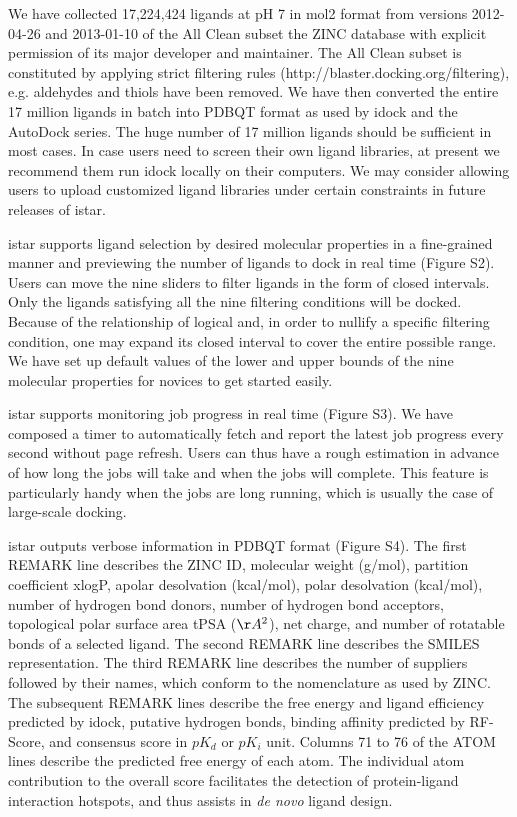 \documentclass[10pt]{article}
\begin{document}
We have collected 17,224,424 ligands at pH 7 in mol2 format from versions 2012-04-26 and 2013-01-10 of the All Clean subset the ZINC database \cite{532,1178} with explicit permission of its major developer and maintainer. The All Clean subset is constituted by applying strict filtering rules (http://blaster.docking.org/filtering), e.g. aldehydes and thiols have been removed. We have then converted the entire 17 million ligands in batch into PDBQT format as used by idock and the AutoDock series. The huge number of 17 million ligands should be sufficient in most cases. In case users need to screen their own ligand libraries, at present we recommend them run idock locally on their computers. We may consider allowing users to upload customized ligand libraries under certain constraints in future releases of istar.

istar supports ligand selection by desired molecular properties in a fine-grained manner and previewing the number of ligands to dock in real time (Figure S2). Users can move the nine sliders to filter ligands in the form of closed intervals. Only the ligands satisfying all the nine filtering conditions will be docked. Because of the relationship of logical and, in order to nullify a specific filtering condition, one may expand its closed interval to cover the entire possible range. We have set up default values of the lower and upper bounds of the nine molecular properties for novices to get started easily.

istar supports monitoring job progress in real time (Figure S3). We have composed a timer to automatically fetch and report the latest job progress every second without page refresh. Users can thus have a rough estimation in advance of how long the jobs will take and when the jobs will complete. This feature is particularly handy when the jobs are long running, which is usually the case of large-scale docking.

istar outputs verbose information in PDBQT format (Figure S4). The first REMARK line describes the ZINC ID, molecular weight (g/mol), partition coefficient xlogP, apolar desolvation (kcal/mol), polar desolvation (kcal/mol), number of hydrogen bond donors, number of hydrogen bond acceptors, topological polar surface area tPSA ($\AA^2$), net charge, and number of rotatable bonds of a selected ligand. The second REMARK line describes the SMILES representation. The third REMARK line describes the number of suppliers followed by their names, which conform to the nomenclature as used by ZINC. The subsequent REMARK lines describe the free energy and ligand efficiency predicted by idock, putative hydrogen bonds, binding affinity predicted by RF-Score, and consensus score in $pK_d$ or $pK_i$ unit. Columns 71 to 76 of the ATOM lines describe the predicted free energy of each atom. The individual atom contribution to the overall score facilitates the detection of protein-ligand interaction hotspots, and thus assists in \textit{de novo} ligand design.
\end{document}
